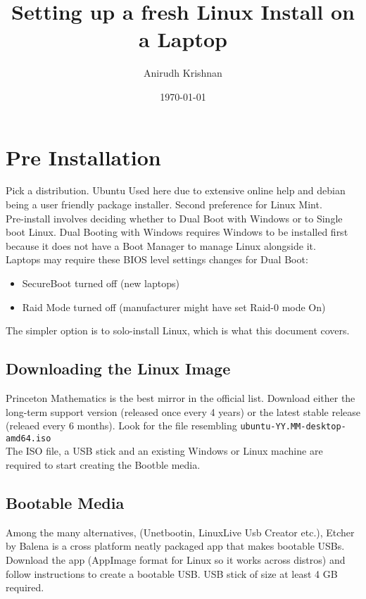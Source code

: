 \documentclass[12pt,letterpaper]{article}
\title{Setting up a fresh Linux Install on a Laptop}
\author{Anirudh Krishnan}
\date{\today}
\begin{document}
\maketitle
\newpage

\tableofcontents
\newpage

\section{Pre Installation}

Pick a distribution. Ubuntu Used here due to extensive online help and debian being a user friendly package installer. Second preference for Linux Mint. \\

Pre-install involves deciding whether to Dual Boot with Windows or to Single boot Linux. Dual Booting with Windows requires Windows to be installed first because it does not have a Boot Manager to manage Linux alongside it. \\

Laptops may require these BIOS level settings changes for Dual Boot:

\begin{itemize}
	\item SecureBoot turned off (new laptops)
	\item Raid Mode turned off (manufacturer might have set Raid-0 mode On)
\end{itemize}

The simpler option is to solo-install Linux, which is what this document covers.

\subsection{Downloading the Linux Image}

Princeton Mathematics is the best mirror in the official list. Download either the long-term support version (released once every 4 years) or the latest stable release (releaed every 6 months). Look for the file resembling \texttt{ubuntu-YY.MM-desktop-amd64.iso} \\

The ISO file, a USB stick and an existing Windows or Linux machine are required to start creating the Bootble media.



\subsection{Bootable Media}
Among the many alternatives, (Unetbootin, LinuxLive Usb Creator etc.), Etcher by Balena is a cross platform neatly packaged app that makes bootable USBs. Download the app (AppImage format for Linux so it works across distros) and follow instructions to create a bootable USB. USB stick of size at least 4 GB required.\\
\end{document}
